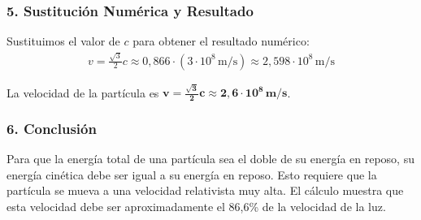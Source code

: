\subsubsection*{5. Sustitución Numérica y Resultado}
Sustituimos el valor de $c$ para obtener el resultado numérico:
\begin{gather}
    v = \frac{\sqrt{3}}{2} c \approx 0,866 \cdot (3 \cdot 10^8\,\text{m/s}) \approx 2,598 \cdot 10^8\,\text{m/s}
\end{gather}
\begin{cajaresultado}
    La velocidad de la partícula es $\boldsymbol{v = \frac{\sqrt{3}}{2}c \approx 2,6 \cdot 10^8\,\textbf{m/s}}$.
\end{cajaresultado}

\subsubsection*{6. Conclusión}
\begin{cajaconclusion}
Para que la energía total de una partícula sea el doble de su energía en reposo, su energía cinética debe ser igual a su energía en reposo. Esto requiere que la partícula se mueva a una velocidad relativista muy alta. El cálculo muestra que esta velocidad debe ser aproximadamente el 86,6\% de la velocidad de la luz.
\end{cajaconclusion}

\newpage